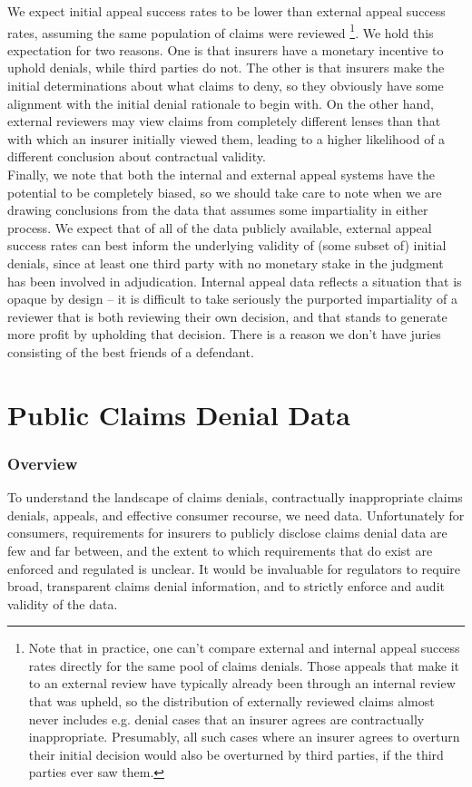 \documentclass[12pt, a4paper,twoside]{report}
\theoremstyle{plain} %
\theoremstyle{definition} %
\theoremstyle{remark} %
\numberwithin{equation}{chapter}
\begin{document}
		We expect initial appeal success rates to be lower than external appeal success rates, assuming the same population of claims were reviewed \footnote{Note that in practice, one can't compare external and internal appeal success rates directly for the same pool of claims denials. Those appeals that make it to an external review have typically already been through an internal review that was upheld, so the distribution of externally reviewed claims almost never includes e.g. denial cases that an insurer agrees are contractually inappropriate. Presumably, all such cases where an insurer agrees to overturn their initial decision would also be overturned by third parties, if the third parties ever saw them.}. We hold this expectation for two reasons. One is that insurers have a monetary incentive to uphold denials, while third parties do not. The other is that insurers make the initial determinations about what claims to deny, so they obviously have some alignment with the initial denial rationale to begin with. On the other hand, external reviewers may view claims from completely different lenses than that with which an insurer initially viewed them, leading to a higher likelihood of a different conclusion about contractual validity.\\
		
		Finally, we note that both the internal and external appeal systems have the potential to be completely biased, so we should take care to note when we are drawing conclusions from the data that assumes some impartiality in either process. We expect that of all of the data publicly available, external appeal success rates can best inform the underlying validity of (some subset of) initial denials, since at least one third party with no monetary stake in the judgment has been involved in adjudication. Internal appeal data reflects a situation that is opaque by design -- it is difficult to take seriously the purported impartiality of a reviewer that is both reviewing their own decision, and that stands to generate more profit by upholding that decision. There is a reason we don't have juries consisting of the best friends of a defendant.
		
		\chapter{Public Claims Denial Data}\label{publicdata}
				
		\subsection{Overview}\label{publicdata:overview}
		To understand the landscape of claims denials, contractually inappropriate claims denials, appeals, and effective consumer recourse, we need data. Unfortunately for consumers, requirements for insurers to publicly disclose claims denial data are few and far between, and the extent to which requirements that do exist are enforced and regulated is unclear. It would be invaluable for regulators to require broad, transparent claims denial information, and to strictly enforce and audit validity of the data.
\end{document}
